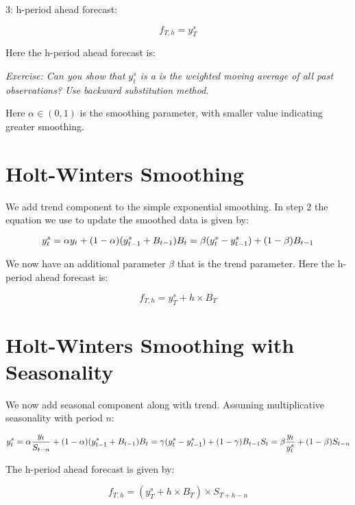 \documentclass[]{book}
\theoremstyle{definition}
\theoremstyle{definition}
\theoremstyle{definition}
\theoremstyle{remark}
\begin{document}
3: h-period ahead forecast:

\[  f_{T,h}= y_T^s\]

Here the h-period ahead forecast is:

\emph{Exercise: Can you show that \(y_{t}^{s}\) is a is the weighted
moving average of all past observations? Use backward substitution
method.}

Here \(\alpha \in (0,1)\) is the smoothing parameter, with smaller value
indicating greater smoothing.

\section{Holt-Winters Smoothing}\label{holt-winters-smoothing}

We add trend component to the simple exponential smoothing. In step 2
the equation we use to update the smoothed data is given by:

\begin{equation}
    y_{t}^{s}= \alpha y_t + (1-\alpha)(y_{t-1}^{s}+B_{t-1})\\
    B_t = \beta (y_t^s -y_{t-1}^s) + (1-\beta) B_{t-1}
 \end{equation}

We now have an additional parameter \(\beta\) that is the trend
parameter. Here the h-period ahead forecast is:

\begin{equation}
  f_{T,h} = y_T^s + h\times B_T
  \end{equation}

\section{Holt-Winters Smoothing with
Seasonality}\label{holt-winters-smoothing-with-seasonality}

We now add seasonal component along with trend. Assuming multiplicative
seasonality with period \(n\):

\begin{equation}
    y_{t}^{s}= \alpha \frac{y_t}{S_{t-n}} + (1-\alpha)(y_{t-1}^{s}+B_{t-1})\\
    B_t = \gamma (y_t^s -y_{t-1}^s) + (1-\gamma) B_{t-1}\\
    S_t = \beta\frac{y_t}{y_t^s}+(1-\beta)S_{t-n}
  \end{equation}

The h-period ahead forecast is given by:

\begin{equation}
    f_{T,h}= (y_T^s + h\times B_T) \times S_{T+h-n}
   \end{equation}
\end{document}

